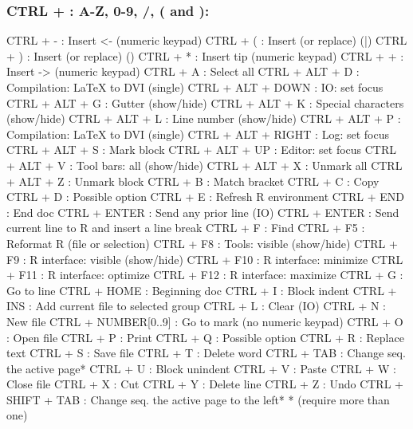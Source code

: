 \newpage
\subsubsection{CTRL + : A-Z, 0-9, /, ( and ):}

\vspace{-0.5cm}
\begin{Rtables}[caption={[CTRL keyboard shortcuts]
    CTRL keyboard shortcuts},
  label=shortcut:ctrl]
  CTRL + -                : Insert <-  (numeric keypad)
  CTRL + (                : Insert (or replace) (|)
  CTRL + )                : Insert (or replace) ()
  CTRL + *                : Insert tip (numeric keypad)
  CTRL + +                : Insert ->  (numeric keypad)
  CTRL + A                : Select all
  CTRL + ALT + D          : Compilation: LaTeX to DVI (single)
  CTRL + ALT + DOWN       : IO: set focus
  CTRL + ALT + G          : Gutter (show/hide)
  CTRL + ALT + K          : Special characters (show/hide)
  CTRL + ALT + L          : Line number (show/hide)
  CTRL + ALT + P          : Compilation: LaTeX to DVI (single)
  CTRL + ALT + RIGHT      : Log: set focus
  CTRL + ALT + S          : Mark block
  CTRL + ALT + UP         : Editor: set focus
  CTRL + ALT + V          : Tool bars: all (show/hide)
  CTRL + ALT + X          : Unmark all
  CTRL + ALT + Z          : Unmark block
  CTRL + B                : Match bracket
  CTRL + C                : Copy
  CTRL + D                : Possible option
  CTRL + E                : Refresh R environment
  CTRL + END              : End doc
  CTRL + ENTER            : Send any prior line (IO)
  CTRL + ENTER            : Send current line to R and insert a line break
  CTRL + F                : Find
  CTRL + F5               : Reformat R (file or selection)
  CTRL + F8               : Tools: visible (show/hide)
  CTRL + F9               : R interface: visible (show/hide)
  CTRL + F10              : R interface: minimize
  CTRL + F11              : R interface: optimize
  CTRL + F12              : R interface: maximize
  CTRL + G                : Go to line
  CTRL + HOME             : Beginning doc
  CTRL + I                : Block indent
  CTRL + INS              : Add current file to selected group
  CTRL + L                : Clear (IO)
  CTRL + N                : New file
  CTRL + NUMBER[0..9]     : Go to mark (no numeric keypad)
  CTRL + O                : Open file
  CTRL + P                : Print
  CTRL + Q                : Possible option
  CTRL + R                : Replace text
  CTRL + S                : Save file
  CTRL + T                : Delete word
  CTRL + TAB              : Change seq. the active page*
  CTRL + U                : Block unindent
  CTRL + V                : Paste
  CTRL + W                : Close file
  CTRL + X                : Cut
  CTRL + Y                : Delete line
  CTRL + Z                : Undo
  CTRL + SHIFT + TAB      : Change seq. the active page to the left*
  * (require more than one)
\end{Rtables}

